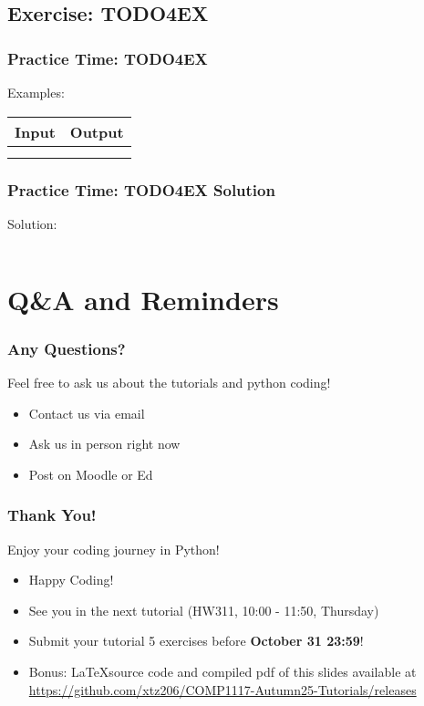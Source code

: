 \documentclass{beamer}
\begin{document}
\subsection{Exercise: TODO4EX}
\begin{frame}[fragile]
    \frametitle{Practice Time: TODO4EX}


    Examples:

    \begin{center}
        \begin{tabular}{|c|c|}
            \hline
            Input & Output  \\ \hline
                  &         \\ \hline
                  &         \\ \hline
        \end{tabular}
\end{center}
\end{frame}
\begin{frame}[fragile]
    \frametitle{Practice Time: TODO4EX Solution}

    Solution:
    \begin{verbatim}
    \end{verbatim}
\end{frame}

\section{Q\&A and Reminders}
\begin{frame}
    \frametitle{Any Questions?}

    Feel free to ask us about the tutorials and python coding!

    \begin{itemize}
        \item Contact us via email
        \item Ask us in person right now
        \item Post on Moodle or Ed
    \end{itemize}
\end{frame}

\begin{frame}
    \frametitle{Thank You!}

    Enjoy your coding journey in Python!

    \begin{itemize}
        \item Happy Coding!
        \item See you in the next tutorial (HW311, 10:00 - 11:50, Thursday)
        \item Submit your tutorial 5 exercises before \textbf{October 31 23:59}!
        
        \item Bonus: \LaTeX source code and compiled pdf of this slides available at
              \href{https://github.com/xtz206/COMP1117-Autumn25-Tutorials/releases}
              {https://github.com/xtz206/COMP1117-Autumn25-Tutorials/releases}
    \end{itemize}
\end{frame}
\end{document}

